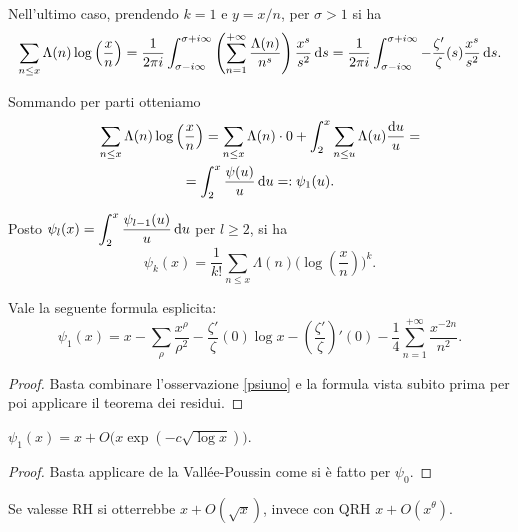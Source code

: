 Nell'ultimo caso, prendendo $k=1$ e $y=x/n$, per $\sigma>1$ si ha
$$\sum_{n \le x} \Lambda(n)\log\left(\frac{x}{n}\right)=\frac{1}{2\pi i}\int_{\sigma-i\infty}^{\sigma+i\infty} \left(\sum_{n=1}^{+\infty} \frac{\Lambda(n)}{n^s}\right)\frac{x^s}{s^2}\mathop{}\!\mathrm{d} s=\frac{1}{2\pi i}\int_{\sigma-i\infty}^{\sigma+i\infty} -\frac{\zeta'}{\zeta}(s)\frac{x^s}{s^2}\mathop{}\!\mathrm{d} s.$$

\begin{oss} \label{psiuno}
  Sommando per parti otteniamo
  \begin{gather*}
    \sum_{n \le x} \Lambda(n)\log\left(\frac{x}{n}\right)=\sum_{n \le x} \Lambda(n) \cdot 0+\int_2^x \sum_{n \le u} \Lambda(u)\frac{\mathop{}\!\mathrm{d} u}{u}= \\
    =\int_2^x \frac{\psi(u)}{u}\mathop{}\!\mathrm{d} u=:\psi_1(u).
  \end{gather*}
\end{oss}

\begin{oss}
  Posto $\displaystyle \psi_l(x)=\int_2^x \frac{\psi_{l-1}(u)}{u}\mathop{}\!\mathrm{d} u$ per $l \ge 2$, si ha
  $$\psi_k(x)=\frac{1}{k!}\sum_{n \le x} \Lambda(n)\Bigg(\log\left(\frac{x}{n}\right)\Bigg)^k.$$
\end{oss}

\begin{prop}
  Vale la seguente formula esplicita:
  $$\psi_1(x)=x-\sum_{\rho} \frac{x^{\rho}}{\rho^2}-\frac{\zeta'}{\zeta}(0)\log{x}-\left(\frac{\zeta'}{\zeta}\right)'(0)-\frac{1}{4}\sum_{n=1}^{+\infty} \frac{x^{-2n}}{n^2}.$$
\end{prop}

\begin{proof}
  Basta combinare l'osservazione \ref{psiuno} e la formula vista subito prima per poi applicare il teorema dei residui.
\end{proof}

\begin{cor}
  $\psi_1(x)=x+O\big(x\exp(-c\sqrt{\log{x}})\big)$.
\end{cor}

\begin{proof}
  Basta applicare de la Vallée-Poussin come si è fatto per $\psi_0$.
\end{proof}

Se valesse RH si otterrebbe $x+O(\sqrt{x})$, invece con QRH $x+O(x^{\theta})$.
